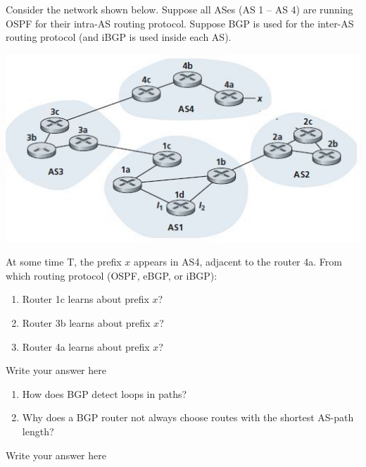 \documentclass{report}
\begin{document}
\newpage



\begin{problem}
Consider the network shown below. Suppose all ASes (AS 1 -- AS 4) are running OSPF for their intra-AS routing protocol. Suppose BGP is used for the
inter-AS routing protocol (and iBGP is used inside each AS).

\begin{center}
\includegraphics[scale=0.7]{hw8-q2.jpg}
\end{center}

At some time T, the prefix $x$ appears in AS4, adjacent to the router 4a.
From which routing protocol (OSPF, eBGP, or iBGP):

\begin{enumerate}
\item Router 1c learns about prefix $x$? 
\item Router 3b learns about prefix $x$?
\item Router 4a learns about prefix $x$?
\end{enumerate}


\begin{answer}{20em}
Write your answer here
\end{answer}

\end{problem}

\newpage



\begin{problem}
\begin{enumerate}
    \item How does BGP detect loops in paths?
    \item Why does a BGP router not always choose routes with the shortest AS-path length?
\end{enumerate}

\begin{answer}{20em}

    Write your answer here
\end{answer}

\end{problem}
\end{document}
